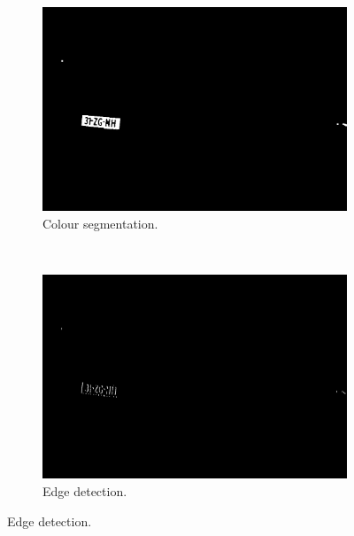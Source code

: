 \begin{figure}[ht]
        \centering
        \begin{subfigure}{0.33\textwidth}
            \includegraphics[width=\textwidth]{plaatjes/yellow-segment}
            \caption{Colour segmentation.}
            \label{fig:color-segmented}
        \end{subfigure}%
        ~ 
        \begin{subfigure}{0.33\textwidth}
            \includegraphics[width=\textwidth]{plaatjes/edge-detection}
            \caption{Edge detection.}
            \label{fig:edge-detected}
        \end{subfigure}%


\end{figure}
